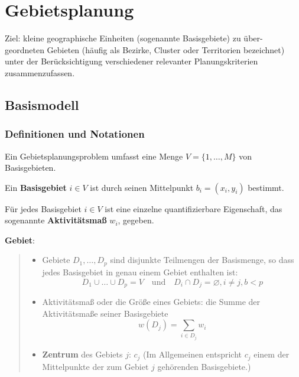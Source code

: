 \chapter{Gebietsplanung} %
\label{cha:gebietsplanung}

  \par Ziel: kleine geographische Einheiten (sogenannte Basisgebiete) zu über- geordneten Gebieten (häufig als Bezirke, Cluster oder Territorien bezeichnet) unter der Berücksichtigung verschiedener relevanter Planungskriterien zusammenzufassen.

  \section{Basismodell} %
  \label{sec:basismodell}

    \subsection{Definitionen und Notationen} %
    \label{sub:definitionen_und_symbole}

      \par Ein Gebietsplanungsproblem umfasst eine Menge $V = \{1, \dots, M\}$ von Basisgebieten.

    \par Ein \textbf{Basisgebiet} $i \in V$ ist durch seinen Mittelpunkt $b_i = (x_i, y_i)$ bestimmt.

    \par Für jedes Basisgebiet $i \in V$ ist eine einzelne quantifizierbare Eigenschaft, das sogenannte \textbf{Aktivitätsmaß} $w_i$, gegeben. \\

    \par \textbf{Gebiet}:

    \begin{quote}
       \begin{itemize}
          \item Gebiete $D_1, \dots, D_p$ sind disjunkte Teilmengen der Basismenge, so dass jedes Basisgebiet in genau einem Gebiet enthalten ist:
            \begin{equation*}
              D_1 \cup \dots \cup D_p = V \quad \text{und} \quad D_i \cap D_j = \varnothing, i \neq j, b < p
            \end{equation*}
          
          \item Aktivitätsmaß oder die Größe eines Gebiets: die Summe der Aktivitätsmaße seiner Basisgebiete
            \begin{equation*}
              w(D_j) = \sum_{i \in D_j}w_i
            \end{equation*}

          \item \textbf{Zentrum} des Gebiets $j$: $c_j$ (Im Allgemeinen entspricht $c_j$ einem der Mittelpunkte der zum Gebiet $j$ gehörenden Basisgebiete.)
        \end{itemize}
    \end{quote}
     

